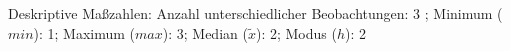 				\label{tableValues:aocc03}
				\vspace*{-\baselineskip}
                    \begin{noten}
                	    \note{} Deskriptive Maßzahlen:
                	    Anzahl unterschiedlicher Beobachtungen: 3%
                	    ; 
                	      Minimum ($min$): 1; 
                	      Maximum ($max$): 3; 
                	      Median ($\tilde{x}$): 2; 
                	      Modus ($h$): 2
                     \end{noten}

